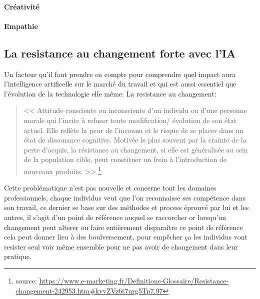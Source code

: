 
        \paragraph{Créativité} 
        \paragraph{Empathie} 

    
    \newpage
    \subsection*{La resistance au changement forte avec l'IA}
        Un facteur qu'il faut prendre en compte pour comprendre quel impact aura l'intelligence artificelle
        sur le marché du travail et qui est aussi essentiel que l'évolution de la technologie elle même:
        La resistance au changement: 
        \newline
        \begin{quote}
            << Attitude consciente ou inconsciente d’un individu ou d’une personne morale qui l’incite 
            à refuser toute modification/ évolution de son état actuel. 
            Elle reflète la peur de l’inconnu et le risque de se placer dans un état 
            de dissonance cognitive. Motivée le plus souvent par la crainte de la perte d’acquis, 
            la résistance au changement, si elle est généralisée au sein de la population cible, 
            peut constituer un frein à l’introduction de nouveaux produits. >> 
            \footnote{source: \url{https://www.e-marketing.fr/Definitions-Glossaire/Resistance-changement-242953.htm\#kvvZVz6t7urg5Tp7.97}}
            \newline 
        \end{quote}

        Cette problématique n'est pas nouvelle et concerne tout les domaines professionnels,
        chaque individus veut que l'on reconnaisse ses compétence dans son travail, ce dernier se 
        base sur des méthodes et process éprouvé par lui et les autres, il s'agit d'un point 
        de référence auquel se raccorcher or lorsqu'un changement peut alterer ou faire 
        entièrement disparaître ce point de référence cela peut donner lieu à des boulversement,
        pour empêcher ça les individus vont resister seul voir même ensemble pour ne pas 
        avoir de changement dans leur pratique.

